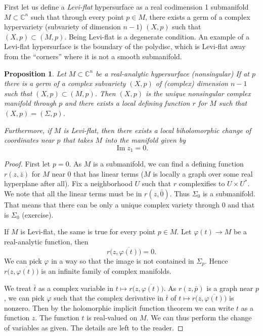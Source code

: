 \documentclass[12pt,openany]{book}
\renewcommand{\Im}{\operatorname{Im}}
\newcommand{\C}{{\mathbb{C}}}
\newcommand{\myindex}[1]{#1\index{#1}}
\theoremstyle{plain}
\newtheorem{prop}[thm]{Proposition}
\theoremstyle{remark}
\theoremstyle{definition}
\theoremstyle{exercise}
\theoremstyle{example}
\begin{document}
First let us define
a \emph{\myindex{Levi-flat}} hypersurface as a real codimension 1
submanifold $M \subset \C^n$ such that through every point $p \in M$,
there exists a germ of a
complex hypervariety (subvariety of dimension $n-1$) $(X,p)$ such that $(X,p)
\subset (M,p)$.  Being Levi-flat is a degenerate condition.
An example of a Levi-flat hypersurface is the 
boundary of the polydisc, which is Levi-flat away from the ``corners'' where it is not a
smooth submanifold.

\begin{prop}
Let $M \subset \C^n$ be a real-analytic hypersurface (nonsingular)
If at $p$ there is a germ of a complex subvariety $(X,p)$ of (complex)
dimension $n-1$ such that $(X,p) \subset (M,p)$.  Then $(X,p)$ is the unique
nonsingular complex manifold through $p$ and there exists a local defining
function $r$ for $M$ such that $(X,p) = (\Sigma,p)$.

Furthermore, if $M$ is Levi-flat,
then there exists a local biholomorphic change of coordinates near $p$ that takes
$M$ into the manifold given by
\begin{equation}
\Im z_1 = 0 .
\end{equation}
\end{prop}

\begin{proof}
First let $p=0$.
As $M$ is a submanifold, we can find
a defining function $r(z,\bar{z})$ for $M$ near $0$ that has linear
terms ($M$ is locally a graph over some real hyperplane after all).
Fix a
neighborhood $U$ such that $r$ complexifies to $U \times U^*$.
We note that all the linear terms must be in $r(z,\bar{0})$.  Thus
$\Sigma_0$ is a submanifold.  That means that there can be only a unique
complex variety through $0$ and that is $\Sigma_0$ (exercise).

If $M$ is Levi-flat, the same is true for every point $p \in M$.
Let $\varphi(t) \to M$ be a real-analytic function, then
\begin{equation}
r\bigl(z,\overline{\varphi(t)}\bigr) = 0 .
\end{equation}
We can pick $\varphi$ in a way so that the image is not contained in
$\Sigma_p$.  Hence $r\bigl(z,\overline{\varphi(t)}\bigr)$ is an infinite family
of complex manifolds.

We treat $\bar{t}$ as a complex variable in
$t \mapsto r\bigl(z,\overline{\varphi(t)}\bigr)$.  As 
$r(z,\bar{p})$ is a graph near $p$, we can pick $\varphi$ such that the
complex derivative in $\bar{t}$ of $t \mapsto
r\bigl(z,\overline{\varphi(t)}\bigr)$
is nonzero.  Then by the holomorphic implicit function theorem
we can write $t$ as a function $z$.  The function $t$ is real-valued
on $M$.  We can thus perform the change of variables as given.  The 
details are left to the reader.
\end{proof}
\end{document}

